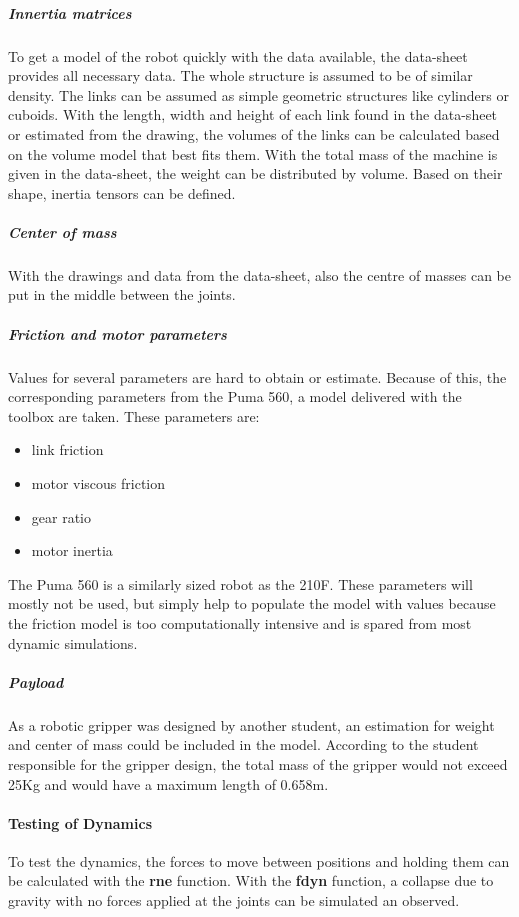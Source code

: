 \subparagraph{Innertia matrices}
To get a model of the robot quickly with the data available, the data-sheet \cite{210FDatasheet} provides all necessary data. The whole structure is assumed to be of similar density. The links can be assumed as simple geometric structures like cylinders or cuboids. With the length, width and height of each link found in the data-sheet or estimated from the drawing, the volumes of the links can be calculated based on the volume model that best fits them. With the total mass of the machine is given in the data-sheet, the weight can be distributed by volume. Based on their shape, inertia tensors can be defined.\\

\subparagraph{Center of mass}
With the drawings and data from the data-sheet, also the centre of masses can be put in the middle between the joints.

\subparagraph{Friction and motor parameters}
Values for several parameters are hard to obtain or estimate.
Because of this, the corresponding parameters from the Puma 560, a model delivered with the toolbox are taken. These parameters are:\\
\begin{itemize}
	\item link friction
	\item motor viscous friction
	\item gear ratio
	\item motor inertia
\end{itemize}
The Puma 560 is a similarly sized robot as the 210F. These parameters will mostly not be used, but simply help to populate the model with values because the friction model is too computationally intensive and is spared from most dynamic simulations.

\subparagraph{Payload}
As a robotic gripper was designed by another student, an estimation for weight and center of mass could be included in the model. According to the student responsible for the gripper design, the total mass of the gripper would not exceed 25Kg and would have a maximum length of 0.658m.

\paragraph{Testing of Dynamics}
To test the dynamics, the forces to move between positions and holding them can be calculated with the \textbf{rne} function.
With the \textbf{fdyn} function, a collapse due to gravity with no forces applied at the joints can be simulated an observed.



